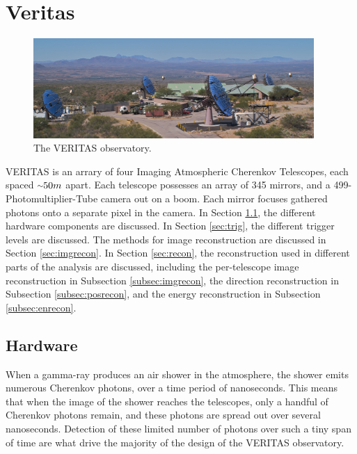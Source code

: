 \cleartooddpage[\thispagestyle{empty}]
\chapter{Veritas}

\begin{figure}[h]
  \begin{center}
    \includegraphics[width=0.95\textwidth]{images/veritas_array_v6}
    \caption[VERITAS Array]{The VERITAS observatory.}\label{fig:veritasarray}
  \end{center}
\end{figure}

VERITAS is an arrary of four Imaging Atmospheric Cherenkov Telescopes, each spaced $\nicetilde50m$ apart.
Each telescope possesses an array of 345 mirrors, and a 499-Photomultiplier-Tube camera out on a boom.
Each mirror focuses gathered photons onto a separate pixel in the camera.
In Section \ref{sec:hardware}, the different hardware components are discussed.
In Section \ref{sec:trig}, the different trigger levels are discussed.
The methods for image reconstruction are discussed in Section \ref{sec:imgrecon}.
In Section \ref{sec:recon}, the reconstruction used in different parts of the analysis are discussed, including the per-telescope image reconstruction in Subsection \ref{subsec:imgrecon}, the direction reconstruction in Subsection \ref{subsec:posrecon}, and the energy reconstruction in Subsection \ref{subsec:enrecon}.


\section{Hardware}\label{sec:hardware}
When a gamma-ray produces an air shower in the atmosphere, the shower emits numerous Cherenkov photons, over a time period of nanoseconds.
This means that when the image of the shower reaches the telescopes, only a handful of Cherenkov photons remain, and these photons are spread out over several nanoseconds.
Detection of these limited number of photons over such a tiny span of time are what drive the majority of the design of the VERITAS observatory.

